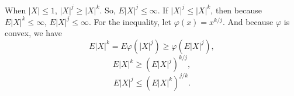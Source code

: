 \documentclass[en, normal, 11pt, black]{elegantnote}
\renewenvironment{proof}{\begin{tcolorbox}[colback=white, colframe=black!50, breakable, title=Proof. ]\setlength{\parskip}{0.8em}}{\,\\\rightline{$\square$}\end{tcolorbox}}
\begin{document}
    \begin{proof}
        When $|X|\leqslant1$, $|X|^j\geqslant|X|^k$. So, $E|X|^j\leqslant\infty$. If $|X|^j\leqslant|X|^k$, then because $E|X|^k\leqslant\infty$, $E|X|^j\leqslant\infty$. For the inequality, let $\varphi(x)=x^{k/j}$. And because $\varphi$ is convex, we have
        \[
            E|X|^{k}=E\varphi\left(|X|^j\right)\geqslant\varphi\left(E|X|^j\right), 
        \]
        \[
            E|X|^{k}\geqslant\left(E|X|^j\right)^{k/j}, 
        \]
        \[
            E|X|^j\leqslant \left(E|X|^{k}\right)^{j/k}. 
        \]
        \vspace{-30pt}
    \end{proof}
\end{document}
